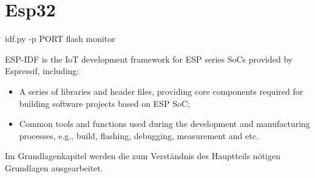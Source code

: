 \section{Esp32}

idf.py -p PORT flash monitor

ESP-IDF is the IoT development framework for ESP series SoCs provided by Espressif, including:


\begin{itemize}

    \item
          A series of libraries and header files, providing core components required for building software projects based on
          ESP SoC;



    \item Common tools and functions used during the development and
          manufacturing processes, e.g., build, flashing, debugging, measurement
          and etc.


\end{itemize}



Im Grundlagenkapitel werden die zum Verständnis des Hauptteils nötigen Grundlagen ausgearbeitet.